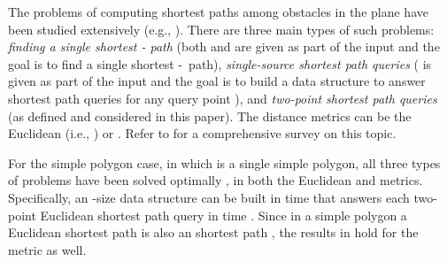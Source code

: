 \documentclass[english,runningheads,11pt]{llncs}
\def\st{-}
\begin{document}
The problems of computing shortest paths among obstacles in the plane
have been studied extensively (e.g.,
\cite{ref:ChenCo13,ref:ChenSh00,ref:ChenA11ESA,ref:ChenCo12arXiv,ref:ChenCo13SoCG,ref:ChenL113STACS,ref:ElGindyOr94,ref:GuibasOp89,ref:GuibasLi87,ref:HershbergerA91,ref:HershbergerAn88,ref:HershbergerCo94,ref:HershbergerAn99,ref:HershbergerA13,ref:InkuluPl09,ref:InkuluA10,ref:KapoorAn97,ref:LeeEu84,ref:LeeSh91,ref:MitchellAn89,ref:MitchellA91,ref:MitchellL192,ref:MitchellSh96}).
There are three main types of such problems:
{\em finding a single shortest - path} (both  and  are
given as part of the input and the goal is to find a single shortest \st\ path),
{\em single-source shortest path queries} ( is given as part of the input
and the goal is to build a data structure to
answer shortest path queries for any query point ), and
{\em two-point shortest path queries} (as defined and considered in this
paper). The distance metrics can be the Euclidean (i.e., ) or .
Refer to \cite{ref:MitchellGe00} for a comprehensive
survey on this topic.

For the simple polygon case, in which  is a single simple polygon,
all three types of problems have been solved optimally
\cite{ref:GuibasOp89,ref:GuibasLi87,ref:HershbergerA91,ref:HershbergerCo94,ref:LeeEu84},
in both the Euclidean and  metrics. Specifically, an -size data structure
can be built in  time that answers each
two-point Euclidean shortest path query in  time
\cite{ref:GuibasOp89,ref:HershbergerA91}.
Since in a simple polygon a Euclidean shortest path is also an  shortest path
\cite{ref:HershbergerCo94}, the results in \cite{ref:GuibasOp89,ref:HershbergerA91}
hold for the  metric as well.
\end{document}
